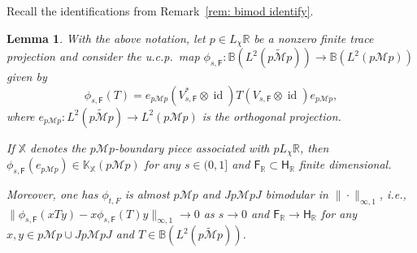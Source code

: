 \documentclass[a4paper,11pt]{amsart}
\newtheorem{lem}[thm]{Lemma}
\theoremstyle{definition}
\newcommand{\B}{{\mathbb B}}
\newcommand{\K}{{\mathbb K}}
\newcommand{\R}{{\mathbb R}}
\newcommand{\X}{{\mathbb X}}
\newcommand{\cM}{{\mathcal M}}
\newcommand{\sH}{\mathsf{H}}
\newcommand{\sF}{\mathsf{F}}
\newcommand{\id}{\operatorname{id}}
\newcommand{\ot}{\otimes}
\begin{document}
Recall the identifications from Remark~\ref{rem: bimod identify}.
\begin{lem}\label{lem: bimodular and compact}
With the above notation, let $p\in L_\chi\R$ be a nonzero finite trace projection
	and consider the u.c.p.\ map $\phi_{s,\sF}: \B(L^2(p\tilde \cM p))\to \B(L^2(p\cM p))$
	given by 
	$$\phi_{s,\sF}(T)= e_{p\cM p} (V_{s,\sF}^*\ot\id)  T (V_{s,\sF}\ot\id)e_{p\cM p},$$
	where $e_{p\cM p}: L^2(p\tilde \cM p)\to L^2(p\cM p)$ is the orthogonal projection.
	
If $\X$ denotes the $p\cM p$-boundary piece associated with $pL_\chi\R$,	
	then $\phi_{s,\sF}(e_{p\cM p})\in \K_{\X}(p\cM p)$ for any $s\in (0,1]$ and $\sF_\R\subset \sH_\R$ finite dimensional.

Moreover, one has
	$\phi_{t, F}$ is almost $p \cM p$ and $Jp \cM pJ$ bimodular in $\|\cdot\|_{\infty,1}$, i.e.,
	$\|\phi_{s,\sF}(xTy)-x\phi_{s,\sF}(T)y\|_{\infty,1}\to 0$ as $s\to 0$ and $\sF_\R\to \sH_\R$
	for any $x,y\in p\cM p\cup Jp\cM pJ$ and $T\in \B(L^2(p \tilde \cM p))$.
\end{lem}
\end{document}

